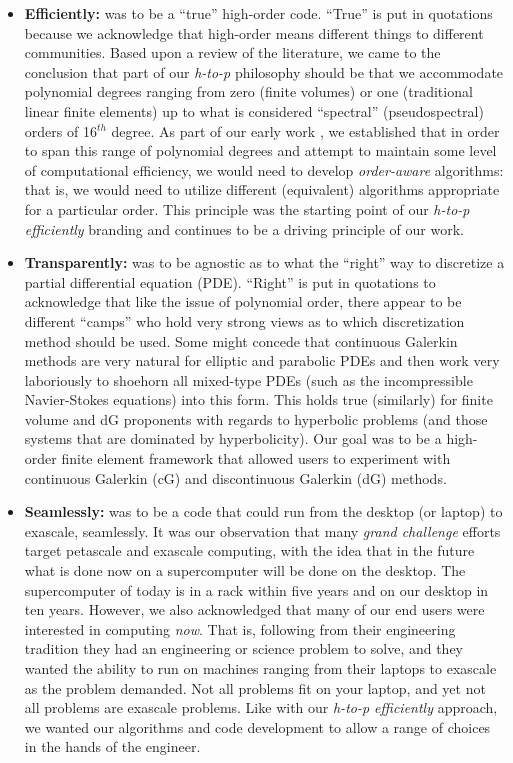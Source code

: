 \begin{itemize}
\item \textbf{Efficiently:} {\nek} was to be a ``true'' high-order code.  ``True'' is put in quotations because we acknowledge
that high-order means different things to different communities.  Based upon a review of the literature, we 
came to the conclusion that part of our {\em h-to-p} philosophy should be that we accommodate polynomial
degrees ranging from zero (finite volumes) or one (traditional linear finite elements) up to what is considered
``spectral'' (pseudospectral) orders of 16$^{th}$ degree.  As part of our early work \cite{VosSK2010}, we established that in
order to span this range of polynomial degrees and attempt to maintain some level of computational 
efficiency, we would need to develop {\em order-aware} algorithms:  that is, we would need to utilize
different (equivalent) algorithms appropriate for a particular order.  This principle was the starting point
of our {\em h-to-p efficiently} branding and continues to be a driving principle of our work. 

\item \textbf{Transparently:} {\nek} was to be agnostic as to what the ``right'' way to discretize a partial differential equation (PDE).
``Right'' is put in quotations to acknowledge that like the issue of polynomial order, there appear to be different
``camps'' who hold very strong views as to which discretization method should be used.   Some might concede that
continuous Galerkin methods are very natural for elliptic and parabolic PDEs and then work very laboriously to 
shoehorn all mixed-type PDEs (such as the incompressible Navier-Stokes equations) into this form.  This holds
true (similarly) for finite volume and dG proponents with regards to hyperbolic problems (and those systems that are
dominated by hyperbolicity).  Our goal was to be a high-order finite element framework that allowed users to experiment with
continuous Galerkin (cG) and discontinuous Galerkin (dG) methods.  

\item \textbf{Seamlessly:}  {\nek} was to be a code that could run from the desktop (or laptop) to exascale, seamlessly.  It was our
observation that many {\em grand challenge} efforts target petascale and exascale computing, with the idea that in the future
what is done now on a supercomputer will be done on the desktop.  The supercomputer of today is in a rack within five
years and on our desktop in ten years.  However, we also acknowledged that many of our end users were interested in computing
{\em now}.  That is, following from their engineering tradition they had an engineering or science problem to solve, and they wanted 
the ability to run on machines ranging from their laptops to exascale as the problem demanded.  Not all problems fit on your laptop, 
and yet not all problems are exascale problems.  Like with our {\em h-to-p efficiently} approach, we wanted our algorithms and code
development to allow a range of choices in the hands of the engineer.
\end{itemize}

